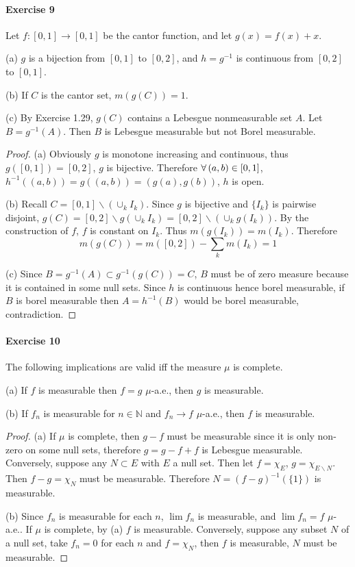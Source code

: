 \paragraph{Exercise 9}
Let $f:[0,1]\to[0,1]$ be the cantor function, and let $g(x)=f(x)+x$.
\par (a) $g$ is a bijection from $[0,1]$ to $[0,2]$, and $h=g^{-1}$ is continuous from $[0,2]$ to $[0,1]$.
\par (b) If $C$ is the cantor set, $m(g(C))=1$.
\par (c) By Exercise 1.29, $g(C)$ contains a Lebesgue nonmeasurable set $A$. Let $B=g^{-1}(A)$. Then $B$ is Lebesgue measurable but not Borel measurable.
\begin{proof}
    (a) Obviously $g$ is monotone increasing and continuous, thus $g([0,1])=[0,2]$, $g$ is bijective. Therefore $\forall\, (a,b)\in[0,1]$, $h^{-1}((a,b))=g((a,b))=(g(a),g(b))$, $h$ is open.
    \par (b) Recall $C=[0,1]\backslash(\cup_kI_k)$. Since $g$ is bijective and $\{I_k\}$ is pairwise disjoint, $g(C)=[0,2]\backslash g(\cup_k I_k)=[0,2]\backslash (\cup_kg(I_k))$. By the construction of $f$, $f$ is constant on $I_k$. Thus $m(g(I_k))=m(I_k)$. Therefore
    $$
    m(g(C))=m([0,2])-\sum_k m(I_k)=1
    $$
    \par (c) Since $B=g^{-1}(A)\subset g^{-1}(g(C))=C$, $B$ must be of zero measure because it is contained in some null sets. Since $h$ is continuous hence borel measurable, if $B$ is borel measurable then $A=h^{-1}(B)$ would be borel measurable, contradiction.
\end{proof}
\paragraph{Exercise 10}
The following implications are valid iff the measure $\mu$ is complete.
\par (a) If $f$ is measurable then $f=g$ $\mu$-a.e., then $g$ is measurable.
\par (b) If $f_n$ is measurable for $n\in\mathbb{N}$ and $f_n\to f$ $\mu$-a.e., then $f$ is measurable.
\begin{proof}
    (a) If $\mu$ is complete, then $g-f$ must be measurable since it is only non-zero on some null sets, therefore $g=g-f+f$ is Lebesgue measurable. Conversely, suppose any $N\subset E$ with $E$ a null set. Then let $f=\chi_E$, $g=\chi_{E\backslash N}$. Then $f-g=\chi_N$ must be measurable. Therefore $N=(f-g)^{-1}(\{1\})$ is measurable.
    \par (b) Since $f_n$ is measurable for each $n$, $\lim f_n$ is measurable, and $\lim f_n=f$ $\mu$-a.e.. If $\mu$ is complete, by (a) $f$ is measurable. Conversely, suppose any subset $N$ of a null set, take $f_n=0$ for each $n$ and $f=\chi_N$, then $f$ is measurable, $N$ must be measurable.
\end{proof}
